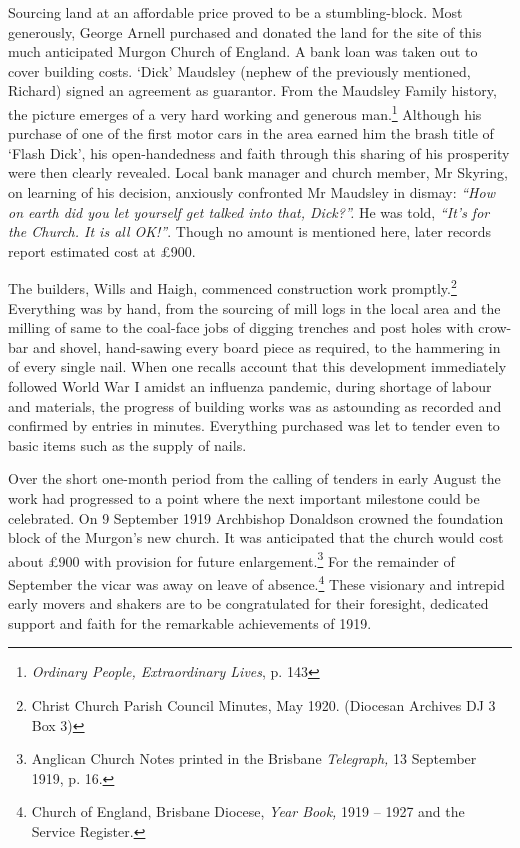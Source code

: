 Sourcing land at an affordable price proved to be a stumbling-block. Most generously, George Arnell purchased and donated the land for the site of this much anticipated Murgon Church of England. A bank loan was taken out to cover building costs. `Dick' Maudsley (nephew of the previously mentioned, Richard) signed an agreement as guarantor. From the Maudsley Family history, the picture emerges of a very hard working and generous man.\footnote{\emph{Ordinary People, Extraordinary Lives}, p. 143} Although his purchase of one of the first motor cars in the area earned him the brash title of `Flash Dick', his open-handedness and faith through this sharing of his prosperity were then clearly revealed. Local bank manager and church member, Mr Skyring, on learning of his decision, anxiously confronted Mr Maudsley in dismay: \emph{``How on earth did you let yourself get talked into that, Dick?''.} He was told, \emph{``It's for the Church. It is all OK!''}. Though no amount is mentioned here, later records report estimated cost at \pounds900.


The builders, Wills and Haigh, commenced construction work promptly.\footnote{Christ Church Parish Council Minutes, May 1920. (Diocesan Archives DJ 3 Box 3)} Everything was by hand, from the sourcing of mill logs in the local area and the milling of same to the coal-face jobs of digging trenches and post holes with crow-bar and shovel, hand-sawing every board piece as required, to the hammering in of every single nail. When one recalls account that this development immediately followed World War I amidst an influenza pandemic, during shortage of labour and materials, the progress of building works was as astounding as recorded and confirmed by entries in minutes. Everything purchased was let to tender even to basic items such as the supply of nails.


Over the short one-month period from the calling of tenders in early August the work had progressed to a point where the next important milestone could be celebrated. On 9 September 1919 Archbishop Donaldson crowned the foundation block of the Murgon's new church. It was anticipated that the church would cost about \pounds900 with provision for future enlargement.\footnote{Anglican Church Notes printed in the Brisbane \emph{Telegraph,} 13 September 1919, p. 16.} For the remainder of September the vicar was away on leave of absence.\footnote{Church of England, Brisbane Diocese, \emph{Year Book,} 1919 -- 1927 and the Service Register.} These visionary and intrepid early movers and shakers are to be congratulated for their foresight, dedicated support and faith for the remarkable achievements of 1919.


